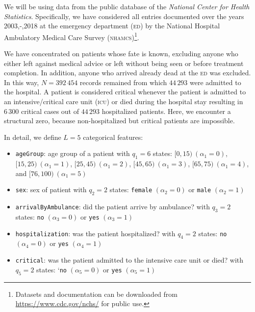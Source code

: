 \documentclass[
]{article}
\providecommand{\tightlist}{%
  \setlength{\itemsep}{0pt}\setlength{\parskip}{0pt}}
\begin{document}
We will be using data from the public database of the \emph{National
Center for Health Statistics}. Specifically, we have considered all
entries documented over the years 2003,-,2018 at the emergency
department (\textsc{ed}) by the National Hospital Ambulatory Medical
Care Survey (\textsc{nhamcs})\footnote{Datasets and documentation can be
  downloaded from
  \href{https://www.cdc.gov/nchs/ahcd/datasets_documentation_related.htm\#notices}{https://www.cdc.gov/nchs/}
  for public use.}.

We have concentrated on patients whose fate is known, excluding anyone
who either left against medical advice or left without being seen or
before treatment completion. In addition, anyone who arrived already
dead at the \textsc{ed} was excluded. In this way, \(N=392\,454\)
records remained from which \(44\,293\) were admitted to the hospital. A
patient is considered critical whenever the patient is admitted to an
intensive/critical care unit (\textsc{icu}) or died during the hospital
stay resulting in \(6\,300\) critical cases out of \(44\,293\)
hospitalized patients. Here, we encounter a structural zero, because
non-hospitalized but critical patients are impossible.

In detail, we define \(L = 5\) categorical features:

\begin{itemize}
\tightlist
\item
  \texttt{ageGroup}: age group of a patient with \(q_1 = 6\) states:
  \([0, 15)\:(\alpha_1 = 0)\), \([15,25)\:(\alpha_1 = 1)\),
  \([25, 45)\:(\alpha_1 = 2)\), \([45,65)\:(\alpha_1 = 3)\),
  \([65, 75)\:(\alpha_1 = 4)\), and \([76, 100)\:(\alpha_1 = 5)\)
\item
  \texttt{sex}: sex of patient with \(q_2 = 2\) states: \texttt{female}
  \((\alpha_2 = 0)\) or \texttt{male} \((\alpha_2 = 1)\)
\item
  \texttt{arrivalByAmbulance}: did the patient arrive by ambulance? with
  \(q_3 = 2\) states: \texttt{no} \((\alpha_3 = 0)\) or \texttt{yes}
  \((\alpha_3 = 1)\)
\item
  \texttt{hospitalization}: was the patient hospitalized? with
  \(q_4 = 2\) states: \texttt{no} \((\alpha_4 = 0)\) or \texttt{yes}
  \((\alpha_4 = 1)\)
\item
  \texttt{critical}: was the patient admitted to the intensive care unit
  or died? with \(q_5 = 2\) states: `\texttt{no} \((\alpha_5 = 0)\) or
  \texttt{yes} \((\alpha_5 = 1)\)
\end{itemize}
\end{document}
